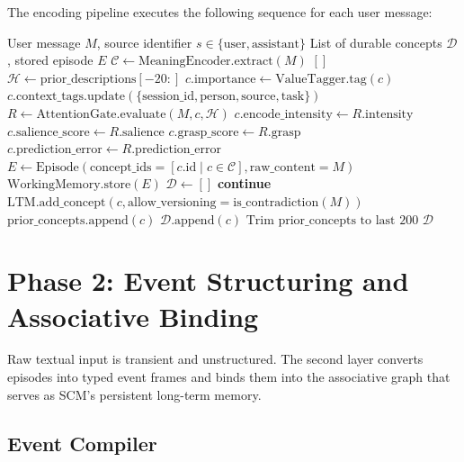 \documentclass[11pt,twocolumn]{article}
\begin{document}
The encoding pipeline executes the following sequence for each user message:

\begin{algorithm}[H]
\caption{Selective Encoding Pipeline}
\label{alg:encoding}
\begin{algorithmic}[1]
\Require User message $M$, source identifier $s \in \{\text{user}, \text{assistant}\}$
\Ensure List of durable concepts $\mathcal{D}$, stored episode $E$
\State $\mathcal{C} \gets \text{MeaningEncoder}.\text{extract}(M)$
 \Return $[]$ \EndIf
\State $\mathcal{H} \gets \text{prior\_descriptions}[-20:]$
    \State $c.\text{importance} \gets \text{ValueTagger}.\text{tag}(c)$
    \State $c.\text{context\_tags}.\text{update}(\{\text{session\_id}, \text{person}, \text{source}, \text{task}\})$
        \State $R \gets \text{AttentionGate}.\text{evaluate}(M, c, \mathcal{H})$
        \State $c.\text{encode\_intensity} \gets R.\text{intensity}$
        \State $c.\text{salience\_score} \gets R.\text{salience}$
        \State $c.\text{grasp\_score} \gets R.\text{grasp}$
        \State $c.\text{prediction\_error} \gets R.\text{prediction\_error}$
    \EndIf
\EndFor
\State $E \gets \text{Episode}(\text{concept\_ids} = [c.\text{id} \mid c \in \mathcal{C}], \text{raw\_content} = M)$
\State $\text{WorkingMemory}.\text{store}(E)$
\State $\mathcal{D} \gets []$
     \textbf{continue} \EndIf
    \State $\text{LTM}.\text{add\_concept}(c, \text{allow\_versioning} = \text{is\_contradiction}(M))$
    \State $\text{prior\_concepts}.\text{append}(c)$
    \State $\mathcal{D}.\text{append}(c)$
\EndFor
\State $\text{Trim prior\_concepts to last 200}$
\Return $\mathcal{D}$
\end{algorithmic}
\end{algorithm}

\section{Phase 2: Event Structuring and Associative Binding}

Raw textual input is transient and unstructured. The second layer converts episodes into typed event frames and binds them into the associative graph that serves as SCM's persistent long-term memory.

\subsection{Event Compiler}
\end{document}
